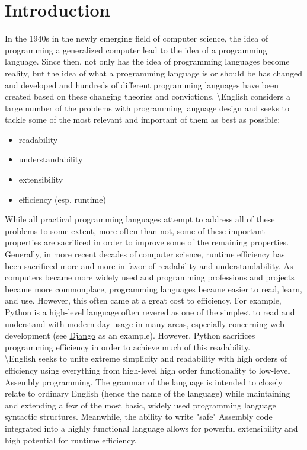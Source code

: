 \documentclass{article}
\title{\name{}}
\date{2015-08-28}
\author{Connor Davey}
\newcommand{\name}{\textbackslash{}English}
\begin{document}
\maketitle
\newpage
	
\tableofcontents
\newpage

\section{Introduction}
In the 1940s in the newly emerging field of computer science, the idea of programming a generalized computer lead to the idea of a programming language. Since then, not only has the idea of programming languages become reality, but the idea of what a programming language is or should be has changed and developed and hundreds of different programming languages have been created based on these changing theories and convictions.
\name{} considers a large number of the problems with programming language design and seeks to tackle some of the most relevant and important of them as best as possible:
	\begin{multicols}{2}
	\begin{itemize}
		\item readability
		\item understandability
		\item extensibility
		\item efficiency (esp. runtime)
	\end{itemize}
	\end{multicols}
\indent While all practical programming languages attempt to address all of these problems to some extent, more often than not, some of these important properties are sacrificed in order to improve some of the remaining properties. Generally, in more recent decades of computer science, runtime efficiency has been sacrificed more and more in favor of readability and understandability. As computers became more widely used and programming professions and projects became more commonplace, programming languages became easier to read, learn, and use. However, this often came at a great cost to efficiency. For example, Python is a high-level language often revered as one of the simplest to read and understand\cite{Sanner99} with modern day usage in many areas, especially concerning web development (see \href{https://www.djangoproject.com/}{Django} as an example). However, Python sacrifices programming efficiency in order to achieve much of this readability\cite{PythonVsJava}\cite{PythonVsC}\cite{Cai05}.\\
\indent \name{} seeks to unite extreme simplicity and readability with high orders of efficiency using everything from high-level high order functionality to low-level Assembly programming. The grammar of the language is intended to closely relate to ordinary English (hence the name of the language) while maintaining and extending a few of the most basic, widely used programming language syntactic structures. Meanwhile, the ability to write "safe" Assembly code integrated into a highly functional language allows for powerful extensibility and high potential for runtime efficiency.
	
\end{document}
